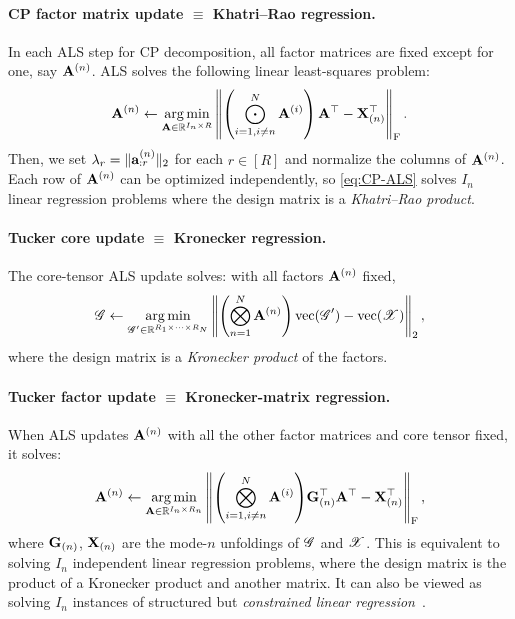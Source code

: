 \paragraph{CP factor matrix update $\equiv$ Khatri--Rao regression.}
In each ALS step for CP decomposition, all factor matrices are fixed except for one, say $\mathbf{A}^{(n)}$.
ALS solves the following linear least-squares problem:
\begin{equation}\label{eq:CP-ALS}
    \mat{A}^{(n)}
    \leftarrow
    \argmin_{\mat{A} \in \R^{I_n \times R}} \, \norm*{ \parens*{ \bigodot_{i=1,i\neq n}^{N} \mat{A}^{(i)} }\,\mat{A}^\top - \mat{X}_{(n)}^\top }_{\frobenius}\,.    
\end{equation}
Then, we set $\lambda_r = \lVert\mathbf{a}^{(n)}_{:r}\rVert_2$ for each $r\in[R]$ and normalize the columns of $\mathbf{A}^{(n)}$.
Each row of $\mathbf{A}^{(n)}$ can be optimized independently, so \eqref{eq:CP-ALS}
solves $I_n$ linear regression problems where the design matrix is a \emph{Khatri--Rao product}.

\paragraph{Tucker core update $\equiv$ Kronecker regression.}
The core-tensor ALS update solves: with all factors $\mathbf{A}^{(n)}$ fixed, 
\[
    \tensor{G}
    \leftarrow
    \argmin_{\tensor{G}' \in\R^{R_1 \times \cdots \times R_N}}\,
    \norm*{\parens*{ \bigotimes_{n=1}^N\mat{A}^{(n)} } \vvec(\tensor{G}') - \vvec(\tensor{X}) }_2\,,
\]
where the design matrix is a \emph{Kronecker product} of the factors.

\paragraph{Tucker factor update $\equiv$ Kronecker-matrix regression.}
When ALS updates $\mathbf{A}^{(n)}$ with all the other factor matrices
and core tensor fixed, it solves:
\[
    \mat{A}^{(n)}
    \leftarrow
    \argmin_{\mat{A}\in \R^{I_n \times R_n}} \,
    \norm*{\parens*{\bigotimes_{i=1,i\neq n}^N \mat{A}^{(i)}} \mat{G}_{(n)}^\top \mat{A}^\top - \mat{X}_{(n)}^\top }_{\frobenius}\,,
\]
where $\mathbf{G}_{(n)}$, $\mathbf{X}_{(n)}$ are the mode-$n$ unfoldings of $\bm{\mathscr{G}}$ and $\bm{\mathscr{X}}$.
This is equivalent to solving $I_n$ independent linear regression problems, where the design matrix is the product of a Kronecker product and another matrix.
It can also be viewed as solving $I_n$ instances of structured but \emph{constrained linear regression}~\citep{fahrbach2022subquadratic}.

